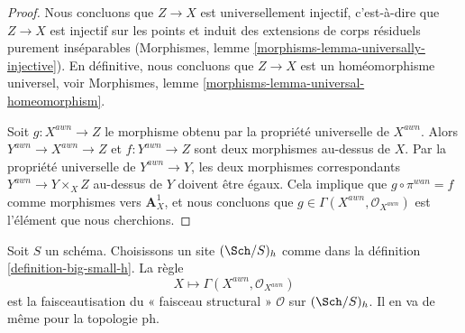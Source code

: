 \begin{proof}
\medskip\noindent
Nous concluons que $Z \to X$ est universellement injectif, c'est-à-dire que
$Z \to X$ est injectif sur les points et induit des
extensions de corps résiduels purement inséparables
(Morphismes, lemme \ref{morphisms-lemma-universally-injective}).
En définitive, nous concluons que $Z \to X$ est un homéomorphisme universel, voir
Morphismes, lemme \ref{morphisms-lemma-universal-homeomorphism}.

\medskip\noindent
Soit $g : X^{awn} \to Z$ le morphisme obtenu par la propriété universelle
de $X^{awn}$. Alors $Y^{awn} \to X^{awn} \to Z$ et $f : Y^{awn} \to Z$
sont deux morphismes au-dessus de $X$. Par la propriété universelle de
$Y^{awn} \to Y$, les deux morphismes correspondants
$Y^{awn} \to Y \times_X Z$ au-dessus de $Y$ doivent être égaux. Cela implique
que $g \circ \pi^{wan} = f$ comme morphismes vers $\mathbf{A}^1_X$,
et nous concluons que $g \in \Gamma(X^{awn}, \mathcal{O}_{X^{awn}})$
est l'élément que nous cherchions.
\end{proof}

\begin{lemma}
\label{lemma-weak-normalization-h-sheaf}
Soit $S$ un schéma. Choisissons un site $(\Sch/S)_h$
comme dans la définition \ref{definition-big-small-h}.
La règle
$$
X \longmapsto \Gamma(X^{awn}, \mathcal{O}_{X^{awn}})
$$
est la faisceautisation du « faisceau structural » $\mathcal{O}$
sur $(\Sch/S)_h$. Il en va de même pour la topologie ph.
\end{lemma}

